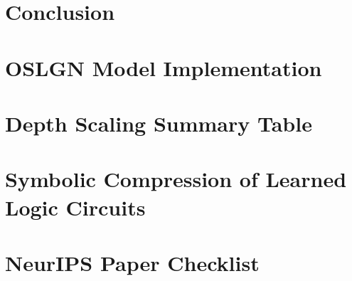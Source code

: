 \documentclass{article}
\begin{document}
\section{Conclusion}
  




\appendix
\section{OSLGN Model Implementation}
  
\section{Depth Scaling Summary Table}
  
\section{Symbolic Compression of Learned Logic Circuits}
  

\newpage
\section*{NeurIPS Paper Checklist}
  
\end{document}
